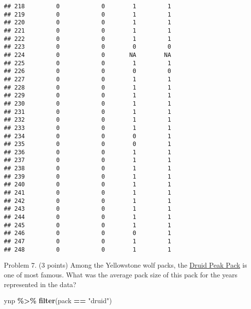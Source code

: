 \documentclass[
]{article}
\newenvironment{Shaded}{\begin{snugshade}}{\end{snugshade}}
\newcommand{\FunctionTok}[1]{\textcolor[rgb]{0.13,0.29,0.53}{\textbf{#1}}}
\newcommand{\NormalTok}[1]{#1}
\newcommand{\SpecialCharTok}[1]{\textcolor[rgb]{0.81,0.36,0.00}{\textbf{#1}}}
\newcommand{\StringTok}[1]{\textcolor[rgb]{0.31,0.60,0.02}{#1}}
\begin{document}
\begin{verbatim}
## 218         0            0        1         1
## 219         0            0        1         1
## 220         0            0        1         1
## 221         0            0        1         1
## 222         0            0        1         1
## 223         0            0        0         0
## 224         0            0       NA        NA
## 225         0            0        1         1
## 226         0            0        0         0
## 227         0            0        1         1
## 228         0            0        1         1
## 229         0            0        1         1
## 230         0            0        1         1
## 231         0            0        1         1
## 232         0            0        1         1
## 233         0            0        1         1
## 234         0            0        0         1
## 235         0            0        0         1
## 236         0            0        1         1
## 237         0            0        1         1
## 238         0            0        1         1
## 239         0            0        1         1
## 240         0            0        1         1
## 241         0            0        1         1
## 242         0            0        1         1
## 243         0            0        1         1
## 244         0            0        1         1
## 245         0            0        1         1
## 246         0            0        0         1
## 247         0            0        1         1
## 248         0            0        1         1
\end{verbatim}

Problem 7. (3 points) Among the Yellowstone wolf packs, the
\href{https://www.pbs.org/wnet/nature/in-the-valley-of-the-wolves-the-druid-wolf-pack-story/209/}{Druid
Peak Pack} is one of most famous. What was the average pack size of this
pack for the years represented in the data?

\begin{Shaded}
\begin{Highlighting}[]
\NormalTok{ynp }\SpecialCharTok{\%\textgreater{}\%} 
  \FunctionTok{filter}\NormalTok{(pack }\SpecialCharTok{==} \StringTok{"druid"}\NormalTok{)}
\end{Highlighting}
\end{Shaded}
\end{document}
